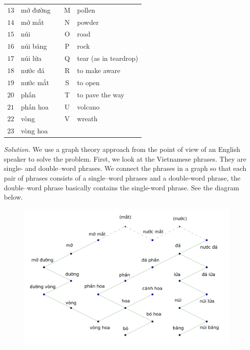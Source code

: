 \begin{multicols}{2}
\begin{table}[H]
{\begin{tabular}{|c|l|c|c|l|}
			$13$ & mở đường   &  & M & pollen                              \\ \cline{1-2} \cline{4-5} 
			$14$ & mở mắt     &  & N & powder                              \\ \cline{1-2} \cline{4-5} 
			$15$ & núi        &  & O & road                                \\ \cline{1-2} \cline{4-5} 
			$16$ & núi băng   &  & P & rock                                \\ \cline{1-2} \cline{4-5} 
			$17$ & núi lửa    &  & Q & tear (as in teardrop)               \\ \cline{1-2} \cline{4-5} 
			$18$ & nước đá    &  & R & to make aware                       \\ \cline{1-2} \cline{4-5} 
			$19$ & nước mắt   &  & S & to open                             \\ \cline{1-2} \cline{4-5} 
			$20$ & phấn       &  & T & to pave the way                     \\ \cline{1-2} \cline{4-5} 
			$21$ & phấn hoa   &  & U & volcano                             \\ \cline{1-2} \cline{4-5} 
			$22$ & vòng       &  & V & wreath                              \\ \cline{1-2} \cline{4-5} 
			$23$ & vòng hoa   &  &   &                                     \\ \cline{1-2} \cline{4-5} 
		\end{tabular}}
		\vspace*{-10pt}
	\end{table}
	\textit{Solution.}
	We use a graph theory approach from the point of view of an English speaker to solve the problem.
	\vskip 0.1cm
	First, we look at the Vietnamese phrases. They are single- and double--word phrases.
	We connect the phrases in a graph so that each pair of phrases consists of a single--word phrases and a double-word phrase,
	the double--word phrase basically contains the single-word phrase. See the diagram below.
	\begin{figure}[H]
		\vspace*{-5pt}
		\centering
		\captionsetup{labelformat= empty, justification=centering}
		\includegraphics[width= 1\linewidth]{hc-2022-2-2-2-1.pdf}

\end{figure}
\end{multicols}
